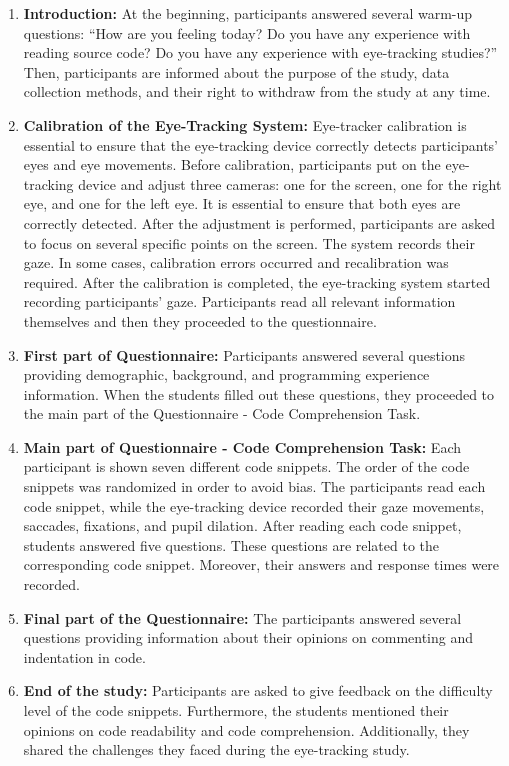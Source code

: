 \begin{enumerate}
    \item \textbf{Introduction:} At the beginning, participants answered several warm-up questions: “How are you feeling today? Do you have any experience with reading source code? Do you have any experience with eye-tracking studies?”  Then, participants are informed about the purpose of the study, data collection methods, and their right to withdraw from the study at any time.

    \item \textbf{Calibration of the Eye-Tracking System:} 
    Eye-tracker calibration is essential to ensure that the eye-tracking device correctly detects participants’ eyes and eye movements. Before calibration, participants put on the eye-tracking device and adjust three cameras: one for the screen, one for the right eye, and one for the left eye. It is essential to ensure that both eyes are correctly detected. After the adjustment is performed, participants are asked to focus on several specific points on the screen. The system records their gaze. In some cases, calibration errors occurred and recalibration was required. After the calibration is completed, the eye-tracking system started recording participants’ gaze. Participants read all relevant information themselves and then they proceeded to the questionnaire.
    
    \item \textbf{First part of Questionnaire:}  
    Participants answered several questions providing demographic, background, and programming experience information. When the students filled out these questions, they proceeded to the main part of the Questionnaire - Code Comprehension Task.

    \item \textbf{Main part of Questionnaire - Code Comprehension Task:}  Each participant is shown seven different code snippets. The order of the code snippets was randomized in order to avoid bias. The participants read each code snippet, while the eye-tracking device recorded their gaze movements, saccades, fixations, and pupil dilation. After reading each code snippet, students answered five questions. These questions are related to the corresponding code snippet. Moreover, their answers and response times were recorded.

    \item \textbf{Final part of the Questionnaire:} 
    The participants answered several questions providing information about their opinions on commenting and indentation in code.

    \item \textbf{End of the study:} 
    Participants are asked to give feedback on the difficulty level of the code snippets. Furthermore, the students mentioned their opinions on code readability and code comprehension. Additionally, they shared the challenges they faced during the eye-tracking study.

\end{enumerate}



